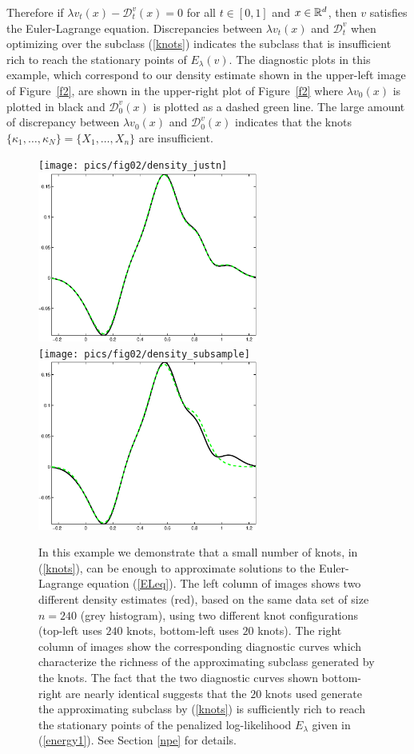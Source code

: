 \documentclass[noinfoline]{imsart}
\begin{document}
 Therefore if   $\lambda v_t(x)-\mathcal D_t^v(x) = 0$ for all $t\in [0,1]$ and $x\in \Bbb R^d$, then $v$ satisfies the Euler-Lagrange equation. Discrepancies between $\lambda v_t(x)$ and $\mathcal D_t^v$ when optimizing over the subclass (\ref{knots}) indicates the subclass that is insufficient rich to reach the stationary points of $E_\lambda(v)$.
 The diagnostic plots in this example, which correspond to our density estimate shown in the upper-left image of Figure~\ref{f2},  are shown in the upper-right plot of Figure~\ref{f2} where $\lambda v_0(x)$ is plotted in  black and $\mathcal D_0^v(x)$ is plotted as a dashed green line. The large amount of discrepancy between $\lambda v_0(x)$  and $\mathcal D_0^v(x)$ indicates that the knots $\{\kappa_1,\ldots, \kappa_N\}=\{ X_1,\ldots,X_n\}$  are insufficient.



\begin{figure}[t]
\centering
\texttt{[image: pics/fig02/density\_justn]}
\includegraphics[height = 2.2in]{pics/fig02/agreement0_justn}\\
\texttt{[image: pics/fig02/density\_subsample]}
\includegraphics[height = 2.2in]{pics/fig02/agreement0_subsample}
\caption{
 \label{f3}
 In this example we demonstrate that a small number of knots, in (\ref{knots}), can be enough to approximate solutions to the  Euler-Lagrange equation (\ref{ELeq}). The left column of images shows two different density estimates (red), based on the same data set  of size $n=240$ (grey histogram), using two different knot configurations (top-left uses $240$ knots, bottom-left uses $20$ knots). The right column of images show the corresponding  diagnostic curves which characterize the richness of the approximating subclass generated by the knots. The fact that the two diagnostic curves shown bottom-right are nearly identical suggests that the $20$ knots  used generate the approximating subclass by (\ref{knots}) is sufficiently rich to reach the stationary points of the penalized log-likelihood $E_\lambda$ given in (\ref{energy1}).
See Section \ref{npe} for details.
 }
 \end{figure}
\end{document}

